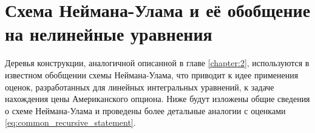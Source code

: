\chapter{Схема Неймана-Улама и её обобщение на нелинейные уравнения}
Деревья конструкции, аналогичной описанной в главе \ref{chapter:2}, используются в известном обобщении схемы Неймана-Улама, что приводит к идее применения оценок, разработанных для линейных интегральных уравнений, к задаче нахождения цены Американского опциона. Ниже будут изложены общие сведения о схеме Неймана-Улама и проведены более детальные аналогии с оценками \eqref{eq:common_recursive_statement}.




